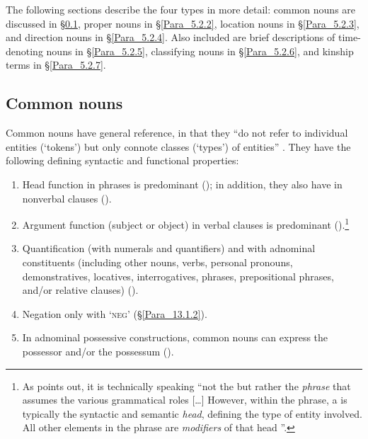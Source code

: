The following sections describe the four  types in more detail: common nouns are discussed in §\ref{Para_5.2.1}, proper nouns in §\ref{Para_5.2.2}, location nouns in §\ref{Para_5.2.3}, and direction nouns in §\ref{Para_5.2.4}. Also included are brief descriptions of time-denoting nouns in §\ref{Para_5.2.5}, classifying nouns in §\ref{Para_5.2.6}, and kinship terms in §\ref{Para_5.2.7}.


\subsection{Common nouns}
\label{Para_5.2.1}
Common nouns have general reference, in that they “do not refer to individual entities (‘tokens’) but only connote classes (‘types') of entities” \citep[58]{Givon.2001}. They have the following defining syntactic and functional properties:



\begin{enumerate}
\item 
Head function in  phrases is predominant (); in addition, they also have  in nonverbal clauses ().

\item 
Argument function (subject or object) in verbal clauses is predominant ().\footnote{As \citet[59]{Givon.2001} points out, it is technically speaking “not the  but rather the \textit{ phrase }that assumes the various grammatical roles [{\ldots}] However, within the  phrase, a  is typically the syntactic and semantic \textit{head}, defining the type of entity involved. All other elements in the  phrase are \textit{modifiers }of that head ”.}

\item 
Quantification (with numerals and quantifiers) and  with adnominal constituents (including other nouns, verbs, personal pronouns, demonstratives, locatives, interrogatives,  phrases, prepositional phras\-es, and/or relative clauses) ().

\item 
Negation only with  ‘\textsc{neg}’ (§\ref{Para_13.1.2}).

\item 
In adnominal possessive constructions, common nouns can express the possessor and/or the possessum ().

\end{enumerate}

